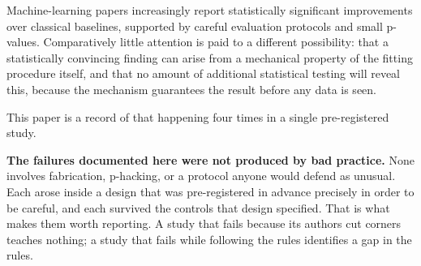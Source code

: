 Machine-learning papers increasingly report statistically significant improvements over
classical baselines, supported by careful evaluation protocols and small p-values. Comparatively
little attention is paid to a different possibility: that a statistically convincing finding can
arise from a mechanical property of the fitting procedure itself, and that no amount of
additional statistical testing will reveal this, because the mechanism guarantees the result
before any data is seen.

This paper is a record of that happening four times in a single pre-registered study.

\textbf{The failures documented here were not produced by bad practice.} None involves fabrication,
p-hacking, or a protocol anyone would defend as unusual. Each arose inside a design that was
pre-registered in advance precisely in order to be careful, and each survived the controls that
design specified. That is what makes them worth reporting. A study that fails because its
authors cut corners teaches nothing; a study that fails while following the rules identifies a
gap in the rules.
